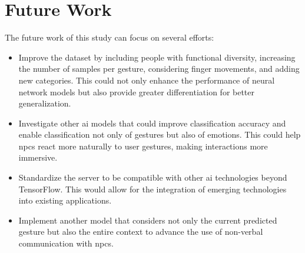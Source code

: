 \section{Future Work}

The future work of this study can focus on several efforts:

\begin{itemize}
    \item Improve the dataset by including people with functional diversity, increasing the number of samples per gesture, considering finger movements, and adding new categories. This could not only enhance the performance of neural network models but also provide greater differentiation for better generalization.
    \item Investigate other \gls{ai} models that could improve classification accuracy and enable classification not only of gestures but also of emotions. This could help \glspl{npc} react more naturally to user gestures, making interactions more immersive.
    \item Standardize the server to be compatible with other \gls{ai} technologies beyond TensorFlow. This would allow for the integration of emerging technologies into existing applications.
    \item Implement another model that considers not only the current predicted gesture but also the entire context to advance the use of non-verbal communication with \glspl{npc}.
\end{itemize}

